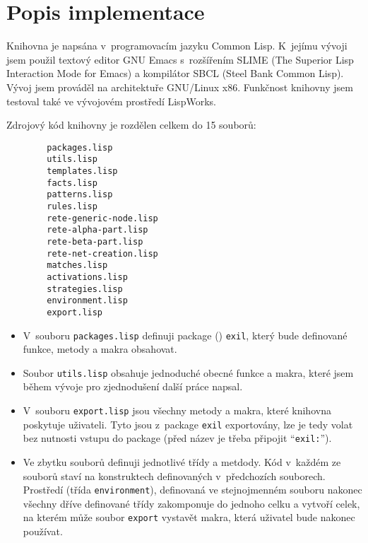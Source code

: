 \section{Popis implementace}
Knihovna je napsána v~programovacím jazyku Common Lisp. K~jejímu vývoji jsem
použil textový editor \textsf{GNU Emacs} s~rozšířením \textsf{SLIME} (The
Superior Lisp Interaction Mode for Emacs) a kompilátor \textsf{SBCL} (Steel Bank
Common Lisp). Vývoj jsem prováděl na architektuře \textsf{GNU/Linux x86}.
Funkčnost knihovny jsem testoval také ve vývojovém prostředí
LispWorks\textsuperscript{\textregistered}.

Zdrojový kód knihovny je rozdělen celkem do 15 souborů:
\begin{verbatim}
        packages.lisp
        utils.lisp
        templates.lisp
        facts.lisp
        patterns.lisp
        rules.lisp
        rete-generic-node.lisp
        rete-alpha-part.lisp
        rete-beta-part.lisp
        rete-net-creation.lisp
        matches.lisp
        activations.lisp
        strategies.lisp
        environment.lisp
        export.lisp
\end{verbatim}
\begin{itemize}
\item V~souboru \verb|packages.lisp| definuji package () \verb|exil|,
který bude definované funkce, metody a makra obsahovat.
\item Soubor \verb|utils.lisp| obsahuje jednoduché obecné funkce a makra, které
jsem během vývoje pro zjednodušení další práce napsal.
\item V~souboru \verb|export.lisp| jsou všechny metody a makra, které knihovna
poskytuje uživateli. Tyto jsou z~package \verb|exil| exportovány, lze je
tedy volat bez nutnosti vstupu do package (před název je třeba připojit
``\verb|exil:|'').
\item Ve zbytku souborů definuji jednotlivé třídy a metdody. Kód v~každém ze
souborů staví na konstruktech definovaných v~předchozích souborech. Prostředí
(třída \verb|environment|), definovaná ve stejnojmenném souboru nakonec všechny
dříve definované třídy zakomponuje do jednoho celku a vytvoří celek, na kterém
může soubor \verb|export| vystavět makra, která uživatel bude nakonec používat.
\end{itemize}
